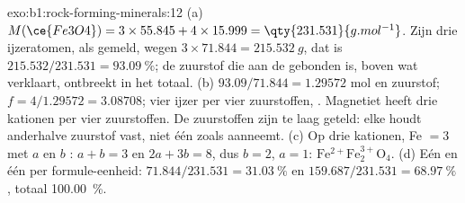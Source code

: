 \begin{solution}{exo:b1:rock-forming-minerals:12}
(a) $M(\ce{Fe3O4}) = 3\times55.845 + 4\times15.999 = \qty{231.531}{g.mol^{-1}}$.
Zijn drie ijzeratomen, als  gemeld, wegen $3\times71.844 = \qty{215.532}{g}$,
dat is $215.532/231.531 = \qty{93.09}{\percent}$; de zuurstof die aan de
 gebonden is, boven wat  verklaart, ontbreekt in het totaal.
(b) $93.09/71.844 = 1.29572$ mol  en zuurstof; $f =
4/1.29572 = 3.08708$; vier ijzer per vier zuurstoffen, . Magnetiet heeft
drie kationen per vier zuurstoffen. De zuurstoffen zijn te laag geteld: elke
 houdt anderhalve zuurstof vast, niet één zoals  aanneemt. (c) Op drie kationen, Fe $= 3$
met $a$  en $b$ : $a + b = 3$ en $2a + 3b = 8$,
dus $b = 2$, $a = 1$: $\mathrm{Fe^{2+}Fe^{3+}_2O_4}$. (d) Eén  en
één  per formule-eenheid: $71.844/231.531 = \qty{31.03}{\percent}$
 en $159.687/231.531 = \qty{68.97}{\percent}$ , totaal
\qty{100.00}{\percent}.
\end{solution}


